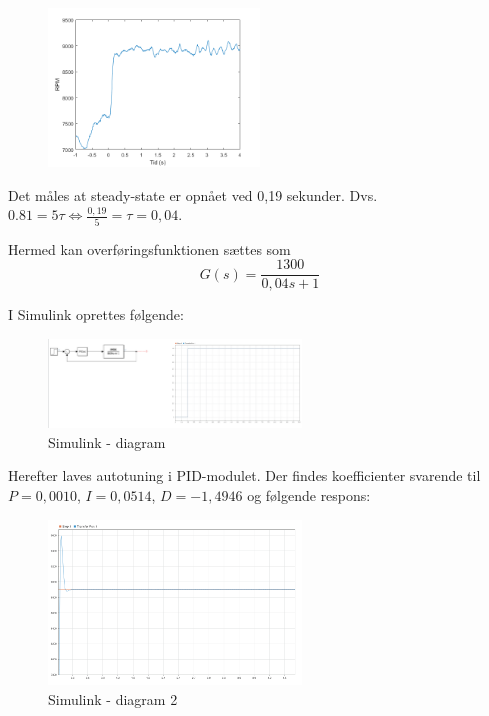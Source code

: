\begin{figure}[h]
  \centering
  \includegraphics[width=0.5\textwidth]{mo5.png}
  \caption{}
  \label{fig:mo5}
\end{figure}

Det måles at steady-state er opnået ved 0,19 sekunder. Dvs. $0.81 = 5\tau \Leftrightarrow \frac{0,19}{5}=\tau=0,04$.

Hermed kan overføringsfunktionen sættes som
\begin{equation}
  \label{eq:1}
G(s) = \frac{1300}{0,04s+1}  
\end{equation}

\clearpage
I Simulink oprettes følgende:

\begin{figure}[h]
  \centering
  \includegraphics[width=0.6\textwidth]{sbil1.png}
  \caption{Simulink - diagram}
  \label{fig:sbil1}
\end{figure}

Herefter laves autotuning i PID-modulet. Der findes koefficienter svarende til $P=0,0010$, $I=0,0514$, $D=-1,4946$ og følgende respons:

\begin{figure}[h]
  \centering
  \includegraphics[width=0.6\textwidth]{sbil2.png}
  \caption{Simulink - diagram 2}
  \label{fig:sbil1}
\end{figure}


